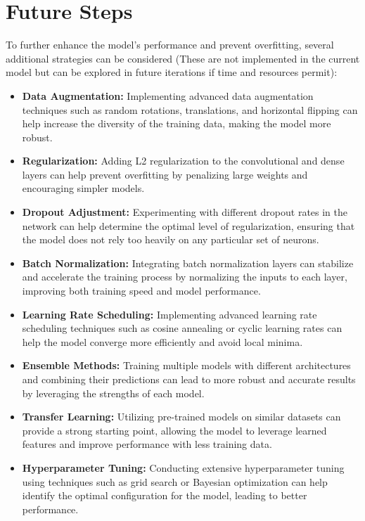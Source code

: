 \section{Future Steps}
\label{sec:chap4 section 3}

To further enhance the model's performance and prevent overfitting, several additional strategies can be considered (These are not implemented in the current model but can be explored in future iterations if time and resources permit):

\begin{itemize}
    \item \textbf{Data Augmentation:} Implementing advanced data augmentation techniques such as random rotations, translations, and horizontal flipping can help increase the diversity of the training data, making the model more robust.

    \item \textbf{Regularization:} Adding L2 regularization to the convolutional and dense layers can help prevent overfitting by penalizing large weights and encouraging simpler models.

    \item \textbf{Dropout Adjustment:} Experimenting with different dropout rates in the network can help determine the optimal level of regularization, ensuring that the model does not rely too heavily on any particular set of neurons.

    \item \textbf{Batch Normalization:} Integrating batch normalization layers can stabilize and accelerate the training process by normalizing the inputs to each layer, improving both training speed and model performance.

    \item \textbf{Learning Rate Scheduling:} Implementing advanced learning rate scheduling techniques such as cosine annealing or cyclic learning rates can help the model converge more efficiently and avoid local minima.

    \item \textbf{Ensemble Methods:} Training multiple models with different architectures and combining their predictions can lead to more robust and accurate results by leveraging the strengths of each model.

    \item \textbf{Transfer Learning:} Utilizing pre-trained models on similar datasets can provide a strong starting point, allowing the model to leverage learned features and improve performance with less training data.

    \item \textbf{Hyperparameter Tuning:} Conducting extensive hyperparameter tuning using techniques such as grid search or Bayesian optimization can help identify the optimal configuration for the model, leading to better performance.
\end{itemize}
